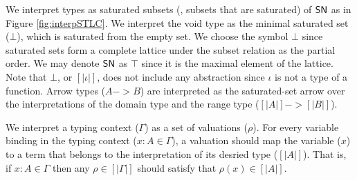 We interpret types as saturated subsets (\ie, subsets that are saturated) of
$\mathsf{SN}$ as in Figure \ref{fig:interpSTLC}. We interpret the void type as
the minimal saturated set ($\bot$), which is saturated from the empty set.
We choose the symbol $\bot$ since saturated sets form a complete lattice
under the subset relation as the partial order. We may denote $\mathsf{SN}$ as $\top$
since it is the maximal element of the lattice. Note that $\bot$,
or $[|\iota|]$, does not include any abstraction since $\iota$ is
not a type of a function. Arrow types ($A -> B$) are interpreted as
the saturated-set arrow over the interpretations of the domain type
and the range type ($[|A|] -> [|B|]$).

We interpret a typing context ($\Gamma$) as a set of valuations ($\rho$).
For every variable binding in the typing context ($x:A \in \Gamma$),
a valuation should map the variable ($x$) to a term that belongs to
the interpretation of its desried type ($[|A|]$). That is, if
$x : A \in \Gamma$ then any $\rho \in [|\Gamma|]$ should satisfy
that $\rho(x) \in [|A|]$.

